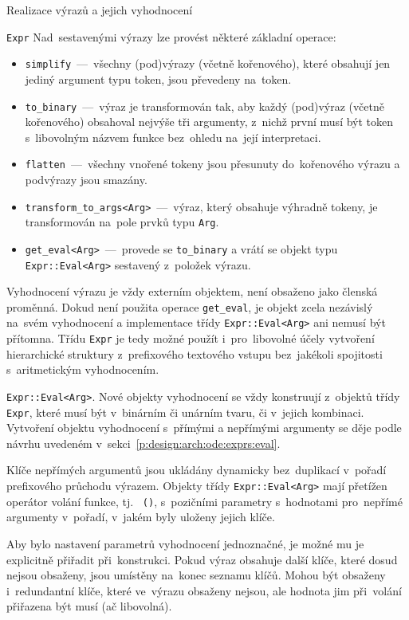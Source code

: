 \documentclass[thesis=M,czech]{FITthesis}[2012/06/26]
\newcommand{\id}[1]{\texttt{#1}}
\newcommand{\rf}[1]{\ref{#1}}
\begin{document}
\begin{section}{Realizace výrazů a jejich vyhodnocení}
\begin{paragraph}{\id{Expr}}
Nad~sestavenými výrazy lze provést některé základní operace:
\begin{itemize}
\item \id{simplify}~---~všechny (pod)výrazy (včetně kořenového),
   které obsahují jen jediný argument typu token,
   jsou převedeny na~token.
\item \id{to\_\-binary}~---~výraz je transformován tak,
   aby každý (pod)výraz (včetně kořenového)
   obsahoval nejvýše tři argumenty,
   z~nichž první musí být token s~libovolným názvem funkce
   bez~ohledu na~její interpretaci.
\item \id{flatten}~---~všechny vnořené tokeny jsou přesunuty
   do~kořenového výrazu a podvýrazy jsou smazány.
\item \id{transform\_\-to\_\-args<Arg>}~---~výraz,
   který obsahuje výhradně tokeny,
   je transformován na~pole prvků typu \id{Arg}.
\item \id{get\_\-eval<Arg>}~---~provede se \id{to\_\-binary}
   a vrátí se objekt typu \id{Expr::\-Eval<Arg>}
   sestavený z~položek výrazu.
\end{itemize}

Vyhodnocení výrazu je vždy externím objektem,
není obsaženo jako členská proměnná.
Dokud není použita operace \id{get\_\-eval},
je objekt zcela nezávislý na~svém vyhodnocení
a implementace třídy \id{Expr::\-Eval<Arg>} ani nemusí být přítomna.
Třídu \id{Expr} je tedy možné použít
i~pro~libovolné účely vytvoření hierarchické struktury
z~prefixového textového vstupu
bez~jakékoli spojitosti s~aritmetickým vyhodnocením.
\end{paragraph} %


\begin{paragraph}{\id{Expr::\-Eval<Arg>}.}\label{p:impl:exprs:eval}
Nové objekty vyhodnocení se vždy konstruují z~objektů třídy \id{Expr},
které musí být v~binárním či unárním tvaru, či v~jejich kombinaci.
Vytvoření objektu vyhodnocení s~přímými a nepřímými argumenty
se děje podle návrhu uvedeném
v~sekci~\rf{p:design:arch:ode:exprs:eval}.

Klíče nepřímých argumentů jsou ukládány dynamicky bez~duplikací
v~pořadí prefixového průchodu výrazem.
Objekty třídy \id{Expr::\-Eval<Arg>} mají přetížen operátor
volání funkce, tj.~ \id{()}, s~pozičními parametry
s~hodnotami pro~nepřímé argumenty v~pořadí,
v~jakém byly uloženy jejich klíče.

Aby bylo nastavení parametrů vyhodnocení jednoznačné,
je možné mu je explicitně přiřadit při~konstrukci.
Pokud výraz obsahuje další klíče,
které dosud nejsou obsaženy,
jsou umístěny na~konec seznamu klíčů.
Mohou být obsaženy i~redundantní klíče,
které ve~výrazu obsaženy nejsou,
ale hodnota jim při~volání přiřazena být musí (ač libovolná).


\end{paragraph}
\end{section}
\end{document}
